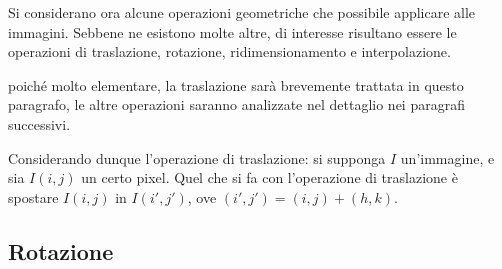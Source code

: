 \documentclass{subfiles}
\begin{document}
Si considerano ora alcune operazioni geometriche che possibile applicare alle immagini.
Sebbene ne esistono molte altre, di interesse risultano essere le operazioni di traslazione, rotazione, ridimensionamento e interpolazione.

\begin{Note*}
    poiché molto elementare, la traslazione sarà brevemente trattata in questo paragrafo, le altre operazioni saranno analizzate nel dettaglio nei paragrafi successivi.
\end{Note*}

Considerando dunque l'operazione di traslazione: si supponga \(I\) un'immagine, e sia \(I(i, j)\) un certo pixel.
Quel che si fa con l'operazione di traslazione è spostare \(I(i,j)\) in \(I(i', j')\), ove \((i',j') = (i, j) + (h, k)\).

\subsection{Rotazione}

\end{document}
